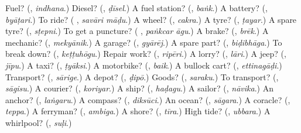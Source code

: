 \begin{tcolorbox}[breakable,colback=teal!4,colframe=teal!35!black,title={Before you move on}]
Fuel? (\textbf{}, \emph{indhana}.) Diesel? (\textbf{}, \emph{ḍīsel}.) A fuel station? (\textbf{}, \emph{baṅk}.) A battery? (\textbf{}, \emph{byāṭari}.) To ride? (\textbf{ }, \emph{savāri māḍu}.) A wheel? (\textbf{}, \emph{cakra}.) A tyre? (\textbf{}, \emph{ṭayar}.) A spare tyre? (\textbf{}, \emph{sṭepni}.) To get a puncture? (\textbf{ }, \emph{paṅkcar āgu}.) A brake? (\textbf{}, \emph{brēk}.) A mechanic? (\textbf{}, \emph{mekyānik}.) A garage? (\textbf{}, \emph{gyārēj}.) A spare part? (\textbf{}, \emph{biḍibhāga}.) To break down? (\textbf{}, \emph{keṭṭuhōgu}.) Repair work? (\textbf{}, \emph{ripēri}.) A lorry? (\textbf{}, \emph{lāri}.) A jeep? (\textbf{}, \emph{jīpu}.) A taxi? (\textbf{}, \emph{ṭyāksi}.) A motorbike? (\textbf{}, \emph{baik}.) A bullock cart? (\textbf{}, \emph{ettinagāḍi}.) Transport? (\textbf{}, \emph{sārige}.) A depot? (\textbf{}, \emph{ḍipō}.) Goods? (\textbf{}, \emph{saraku}.) To transport? (\textbf{}, \emph{sāgisu}.) A courier? (\textbf{}, \emph{koriyar}.) A ship? (\textbf{}, \emph{haḍagu}.) A sailor? (\textbf{}, \emph{nāvika}.) An anchor? (\textbf{}, \emph{laṅgaru}.) A compass? (\textbf{}, \emph{diksūci}.) An ocean? (\textbf{}, \emph{sāgara}.) A coracle? (\textbf{}, \emph{teppa}.) A ferryman? (\textbf{}, \emph{ambiga}.) A shore? (\textbf{}, \emph{tīra}.) High tide? (\textbf{}, \emph{ubbara}.) A whirlpool? (\textbf{}, \emph{suḷi}.)
\end{tcolorbox}
